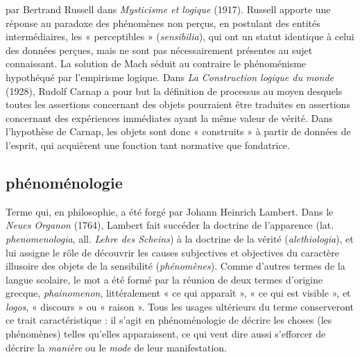 par Bertrand Russell dans {\it Mysticisme et
logique} (1917). Russell apporte une
réponse au paradoxe des phénomènes
non perçus, en postulant des entités intermédiaires,
les « perceptibles » ({\it sensibilia}),
qui ont un statut identique à celui des
données perçues, mais ne sont pas nécessairement
présentes au sujet connaissant.
La solution de Mach séduit au contraire
le phénoménisme hypothéqué par l’empirisme
logique. Dans {\it La Construction
logique du monde} (1928), Rudolf Carnap
a pour but la définition de processus au
moyen desquels toutes les assertions
concernant des objets pourraient être traduites
en assertions concernant des expériences
immédiates ayant la même valeur
de vérité. Dans l'hypothèse de Carnap, les
objets sont donc « construits » à partir de
données de l’esprit, qui acquièrent une
fonction tant normative que fondatrice.

\subsection{phénoménologie}
Terme qui, en philosophie,
a été forgé par Johann Heinrich
Lambert. Dans le {\it Neues Organon} (1764),
Lambert fait succéder la doctrine de l’apparence
(lat. {\it phenomenologia}, all. {\it Lehre
des Scheins}) à la doctrine de la vérité ({\it alethiologia}),
et lui assigne le rôle de découvrir
les causes subjectives et objectives du
caractère illusoire des objets de la sensibilité
({\it phénomènes}). Comme d’autres
termes de la langue scolaire, le mot a été
formé par la réunion de deux termes
d’origine grecque, {\it phainomenon}, littéralement
« ce qui apparaît », « ce qui est visible »,
et {\it logos}, « discours » ou « raison ».
Tous les usages ultérieurs du terme
conserveront ce trait caractéristique : il
s’agit en phénoménologie de décrire les
choses (les phénomènes) telles qu'elles
apparaissent, ce qui veut dire aussi s’efforcer
de décrire la {\it manière} ou le {\it mode}
de leur manifestation.

